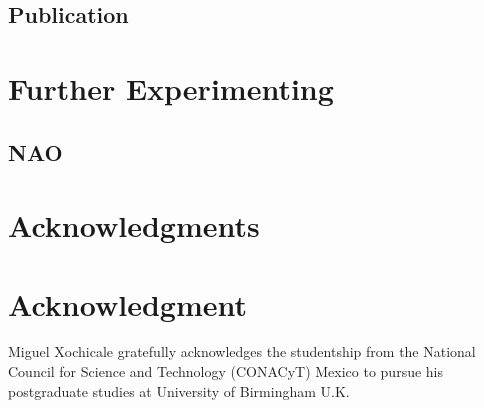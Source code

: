 \documentclass[10pt,journal,onecolumn,compsoc]{IEEEtran}
\begin{document}
\subsection{Publication}


\section{Further Experimenting}


\subsection{NAO}



\ifCLASSOPTIONcompsoc
  \section*{Acknowledgments}
\else
  \section*{Acknowledgment}
\fi

Miguel Xochicale gratefully acknowledges the studentship from 
the National Council for Science and Technology (CONACyT) Mexico
to pursue his postgraduate studies at University of Birmingham U.K.

\ifCLASSOPTIONcaptionsoff
  \newpage
\fi





%
%
%
% 
% 
\end{document}
